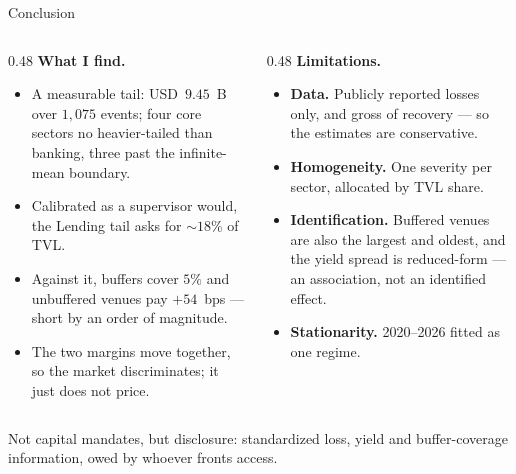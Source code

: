 \documentclass[10pt,xcolor=x11names,aspectratio=169]{beamer}
\begin{document}
\begin{frame}{Conclusion}
  \vskip -3mm
  \begin{columns}[T]
    \begin{column}{0.48\textwidth}
      \textbf{What I find.}
      \small
      \begin{itemize}
        \item A measurable tail: USD~$9.45$~B over $1{,}075$ events; four core
              sectors no heavier-tailed than banking, three past the
              infinite-mean boundary.
        \item Calibrated as a supervisor would, the Lending tail asks for
              $\sim 18\%$ of TVL.
        \item Against it, buffers cover $5\%$ and unbuffered venues pay
              $+54$~bps --- short by an order of magnitude.
        \item The two margins move together, so the market discriminates; it
              just does not price.
      \end{itemize}
    \end{column}
    \begin{column}{0.48\textwidth}
      \textbf{Limitations.}
      \small
      \begin{itemize}
        \item \textbf{Data.} Publicly reported losses only, and gross of
              recovery --- so the estimates are conservative.
        \item \textbf{Homogeneity.} One severity per sector, allocated by TVL
              share.
        \item \textbf{Identification.} Buffered venues are also the largest
              and oldest, and the yield spread is reduced-form --- an
              association, not an identified effect.
        \item \textbf{Stationarity.} 2020--2026 fitted as one regime.
      \end{itemize}
    \end{column}
  \end{columns}
  \begin{takeaway}
    Not capital mandates, but disclosure: standardized loss, yield and
    buffer-coverage information, owed by whoever fronts access.
  \end{takeaway}
\end{frame}

\questionsslide
\closingslide
\end{document}
